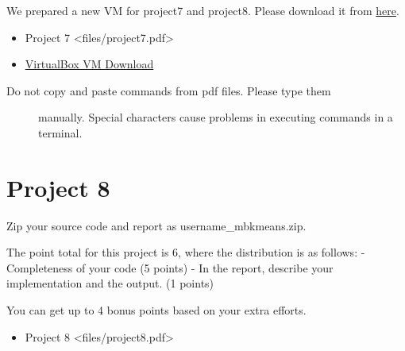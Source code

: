 We prepared a new VM for project7 and project8. Please download it from
\href{https://drive.google.com/file/d/0B2iFsq4CY1DteHhJUEk5cDNJajQ/view}{here}.

\begin{itemize}
\tightlist
\item
  Project 7 \textless{}files/project7.pdf\textgreater{}
\item
  \href{https://drive.google.com/file/d/0B2iFsq4CY1DteHhJUEk5cDNJajQ/view}{VirtualBox
  VM Download}
\end{itemize}

\begin{description}
\item[Do not copy and paste commands from pdf files. Please type them]
manually. Special characters cause problems in executing commands in a
terminal.
\end{description}

\chapter{Project 8}\label{project-8}

Zip your source code and report as username\_mbkmeans.zip.

The point total for this project is 6, where the distribution is as
follows: - Completeness of your code (5 points) - In the report,
describe your implementation and the output. (1 points)

You can get up to 4 bonus points based on your extra efforts.

\begin{itemize}
\tightlist
\item
  Project 8 \textless{}files/project8.pdf\textgreater{}
\end{itemize}
